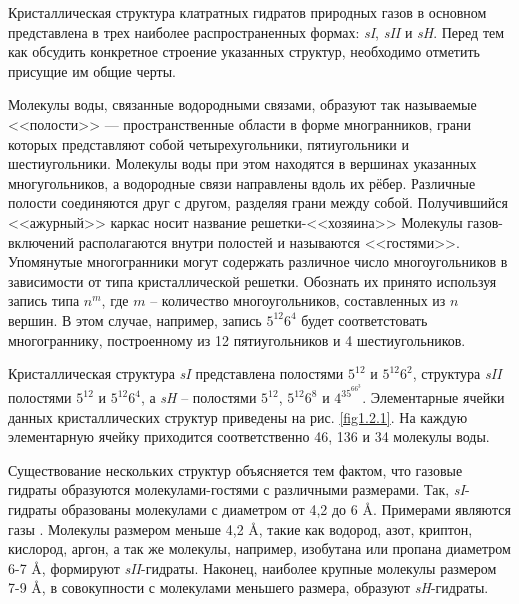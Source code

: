 \par Кристаллическая структура клатратных гидратов природных газов в основном представлена в трех наиболее распространенных формах: \textit{sI}, \textit{sII} и \textit{sH}. Перед тем как обсудить конкретное строение указанных структур, необходимо отметить присущие им общие черты.
\par Молекулы воды, связанные водородными связами, образуют так называемые <<полости>> --- пространственные области в форме многранников, грани которых представляют собой четырехугольники, пятиугольники и шестиугольники. Молекулы воды при этом находятся в вершинах указанных многугольников, а водородные связи направлены вдоль их рёбер. Различные полости соединяются друг с другом, разделяя грани между собой. Получившийся <<ажурный>> каркас носит название решетки-<<хозяина>> Молекулы газов-включений располагаются внутри полостей и называются <<гостями>>. Упомянутые многогранники могут содержать различное число многоугольников в зависимости от типа кристаллической решетки. Обознать их принято используя запись типа $n^m$, где $m$ -- количество многоугольников, составленных из $n$ вершин. В этом случае, например, запись $5^{12}6^4$ будет соответстовать многограннику, построенному из 12 пятиугольников и 4 шестиугольников.
\par Кристаллическая структура \textit{sI} представлена полостями $5^{12}$ и $5^{12}6^2$, структура \textit{sII} полостями $5^12$ и $5^{12}6^4$, а \textit{sH} -- полостями $5^{12}$, $5^{12}6^8$ и $4^35^66^3$. Элементарные ячейки данных кристаллических структур приведены на рис. \ref{fig1.2.1}. На каждую элементарную ячейку приходится соответственно 46, 136 и 34 молекулы воды.

\par Существование нескольких структур объясняется тем фактом, что газовые гидраты образуются молекулами-гостями с различными размерами. Так, \textit{sI}-гидраты образованы молекулами с диаметром от 4,2 до 6 \si{\angstrom}. Примерами являются газы . Молекулы размером меньше 4,2 \si{\angstrom}, такие как водород, азот, криптон, кислород, аргон, а так же молекулы, например, изобутана или пропана диаметром 6-7 \si{\angstrom}, формируют \textit{sII}-гидраты. Наконец, наиболее крупные молекулы размером 7-9 \si{\angstrom}, в совокупности с молекулами меньшего размера, образуют \textit{sH}-гидраты.

